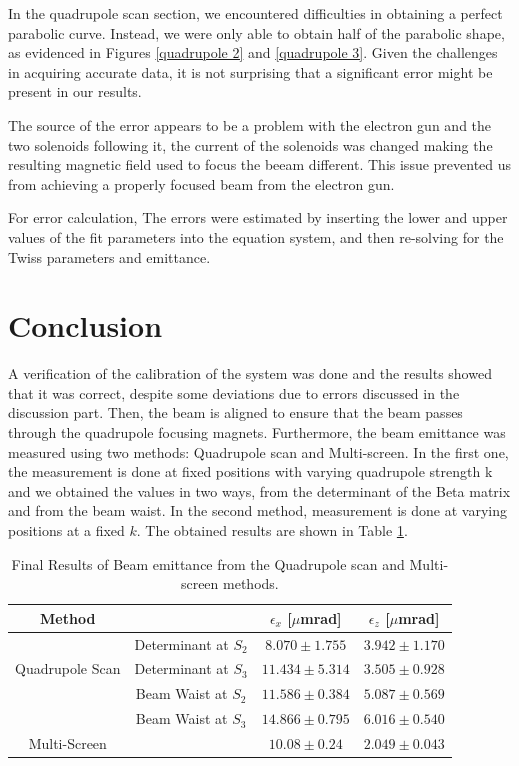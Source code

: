 \documentclass[12pt]{article}
\begin{document}
In the quadrupole scan section, we encountered difficulties in obtaining a perfect parabolic curve. Instead, we were only able to obtain half of the parabolic shape, as evidenced in Figures \ref{quadrupole 2} and \ref{quadrupole 3}. Given the challenges in acquiring accurate data, it is not surprising that a significant error might be present in our results.

The source of the error appears to be a problem with the electron gun and the two solenoids following it, the current of the solenoids was changed making the resulting magnetic field used to focus the beeam different.  This issue prevented us from achieving a properly focused beam from the electron gun.

For error calculation, The errors were estimated by inserting the lower and upper values of the fit parameters into the equation system, and then re-solving for the Twiss parameters and emittance. 

\section{Conclusion}
A verification of the calibration of the system was done and the results showed that it was correct, despite some deviations due to errors discussed in the discussion part. Then, the beam is aligned to ensure that the beam passes through
the quadrupole focusing magnets. Furthermore, the beam emittance was measured using two methods: Quadrupole scan and Multi-screen. In the first one, the measurement is done at fixed positions with varying quadrupole strength k and we obtained the values in two ways, from the determinant of the Beta matrix and from the beam waist. In the second method, measurement is done at varying positions at a fixed $k$.
The obtained results are shown in Table \ref{final table}. 


\begin{table}[H]
    \centering
    \begin{tabular}{cccc}
        \hline 
        \hline
        Method & & $\epsilon_x$ [$\mu$mrad] & $\epsilon_z$ [$\mu$mrad] \\
        
        \hline \multirow{3}{*}{ Quadrupole Scan } & Determinant at $S_2$ & $8.070 \pm 1.755$ & $3.942 \pm 1.170$  \\
        & Determinant at $S_3$ & $11.434 \pm 5.314$ & $3.505 \pm 0.928$ \\
        & Beam Waist at $S_2$ & $ 11.586 \pm 0.384$ & $5.087 \pm 0.569$ \\
        & Beam Waist at $S_3$ & $14.866 \pm 0.795$  & $6.016 \pm 0.540$ \\
        \hline
         Multi-Screen  &  & $10.08 \pm 0.24$ & $2.049 \pm 0.043$  \\
        \hline
        \end{tabular}
    
    
    \caption{Final Results of Beam emittance from the Quadrupole scan and Multi-screen methods.}
    \label{final table}
\end{table}
  
\end{document}
